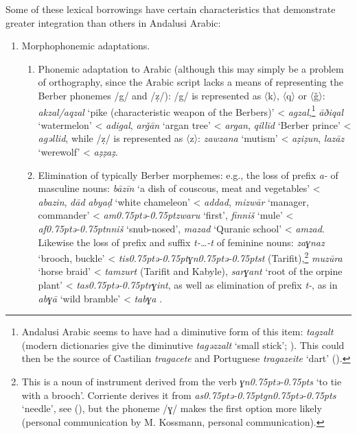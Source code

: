 \documentclass[output=paper,modfonts,nonflat]{langsci/langscibook}
\begin{document}
Some of these lexical borrowings have certain characteristics that demonstrate greater integration than others in Andalusi Arabic: 

\begin{enumerate}
\item Morphophonemic adaptations.

\begin{enumerate}
\item Phonemic adaptation to Arabic (although this may simply be a problem of orthography, since the Arabic script lacks a means of representing the Berber phonemes /g/ and /ẓ/): /g/ is represented as 〈k〉, 〈q〉 or 〈ǧ〉: \textit{akzal/aqzal} ‘pike (characteristic weapon of the Berbers)’ < \textit{agzal},\footnote{Andalusi Arabic seems to have had a diminutive form of this item: \textit{tagzalt} (modern dictionaries give the diminutive \textit{tagǝzzalt} ‘small stick’; \citealt{Taïfi1991}). This could then be the source of Castilian \textit{tragacete} and Portuguese \textit{tragazeite} ‘dart’ (\citealt{CorrientePereiraVicenteforthcoming}).}  \textit{āðiqal} ‘watermelon’ < \textit{adigal}, \textit{arǧān} ‘argan tree’ < \textit{argan}, \textit{qillīd} ‘Berber prince’ < \textit{agǝllid}, while /ẓ/ is represented as 〈z〉: \textit{zawzana} ‘mutism’ < \textit{aẓiẓun}, \textit{lazāz} ‘werewolf’ < \textit{aẓẓaẓ}. 

\item Elimination of typically Berber morphemes: e.g., the loss of prefix \textit{a-} of masculine nouns: \textit{bāzīn} ‘a dish of couscous, meat and vegetables’ < \textit{abazin}, \textit{dād} \textit{abyaḍ} ‘white chameleon’ < \textit{addad}, \textit{mizwār} ‘manager, commander’ < \textit{am\kern 0.75ptǝ\kern -0.75ptzwaru} ‘first’, \textit{finniš} `mule' < \textit{af\kern 0.75ptǝ\kern -0.75ptnniš} `snub-nosed', \textit{mazad} ‘Quranic school’ < \textit{amzad}. Likewise the loss of prefix and suffix \textit{t-…-t} of feminine nouns: \textit{zaɣnaz} ‘brooch, buckle’ < \textit{tis\kern 0.75ptǝ\kern -0.75ptɣn\kern 0.75ptǝ\kern -0.75ptst} (Tarifit),\footnote{This is a noun of instrument derived from the verb \textit{ɣn\kern 0.75ptǝ\kern -0.75pts} ‘to tie with a brooch’. Corriente derives it from \textit{as\kern 0.75ptǝ\kern -0.75ptgn\kern 0.75ptǝ\kern -0.75pts} ‘needle’, see (\citealt{CorrientePereiraVicenteforthcoming}), but the phoneme /ɣ/ makes the first option more likely (personal communication by M. Kossmann, personal communication).} \textit{muzūra} ‘horse braid’ < \textit{tamzurt} (Tarifit and Kabyle), \textit{sarɣant} ‘root of the orpine plant’ < \textit{tas\kern 0.75ptǝ\kern -0.75ptrɣint}, as well as elimination of prefix \textit{t-}, as in \textit{abɣā} ‘wild bramble’ < \textit{tabɣa} . 
\end{enumerate}


\end{enumerate}
\end{document}
